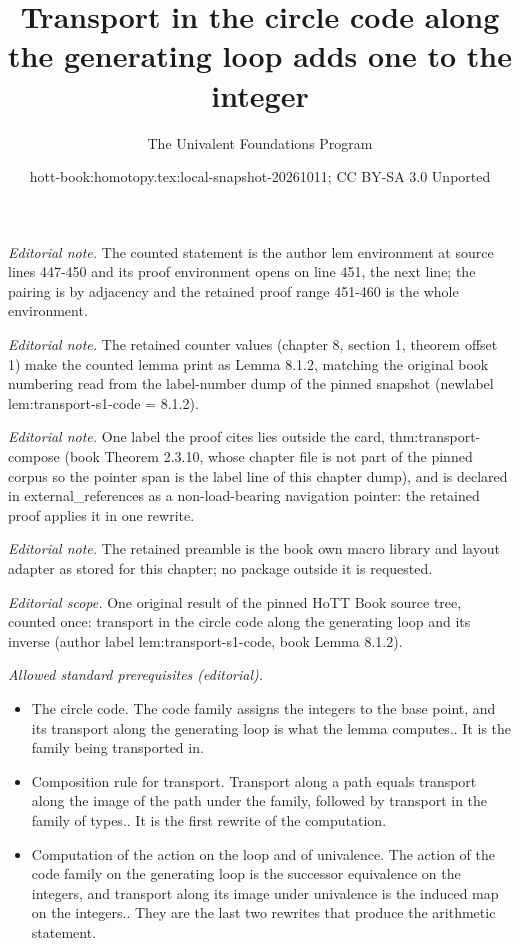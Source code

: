 \documentclass[10pt,a4paper]{article}
\title{Transport in the circle code along the generating loop adds one to the integer}
\author{The Univalent Foundations Program}
\date{hott-book:homotopy.tex:local-snapshot-20261011; CC BY-SA 3.0 Unported}
\newcounter{chapter}
\theoremstyle{definition}
\theoremstyle{remark}
\numberwithin{equation}{section}
\begin{document}
\maketitle
\setcounter{chapter}{8}
\setcounter{section}{1}
\setcounter{thm}{1}
\noindent\textit{Editorial note.} The counted statement is the author lem environment at source lines 447-450 and its proof environment opens on line 451, the next line; the pairing is by adjacency and the retained proof range 451-460 is the whole environment.\par\medskip
\noindent\textit{Editorial note.} The retained counter values (chapter 8, section 1, theorem offset 1) make the counted lemma print as Lemma 8.1.2, matching the original book numbering read from the label-number dump of the pinned snapshot (newlabel lem:transport-s1-code = 8.1.2).\par\medskip
\noindent\textit{Editorial note.} One label the proof cites lies outside the card, thm:transport-compose (book Theorem 2.3.10, whose chapter file is not part of the pinned corpus so the pointer span is the label line of this chapter dump), and is declared in external\_references as a non-load-bearing navigation pointer: the retained proof applies it in one rewrite.\par\medskip
\noindent\textit{Editorial note.} The retained preamble is the book own macro library and layout adapter as stored for this chapter; no package outside it is requested.\par\medskip
\noindent\textit{Editorial scope.} One original result of the pinned HoTT Book source tree, counted once: transport in the circle code along the generating loop and its inverse (author label lem:transport-s1-code, book Lemma 8.1.2).\par\medskip
\noindent\textit{Allowed standard prerequisites (editorial).}\begin{itemize}
\item The circle code. The code family assigns the integers to the base point, and its transport along the generating loop is what the lemma computes.. It is the family being transported in.
\item Composition rule for transport. Transport along a path equals transport along the image of the path under the family, followed by transport in the family of types.. It is the first rewrite of the computation.
\item Computation of the action on the loop and of univalence. The action of the code family on the generating loop is the successor equivalence on the integers, and transport along its image under univalence is the induced map on the integers.. They are the last two rewrites that produce the arithmetic statement.
\end{itemize}\medskip
\end{document}
